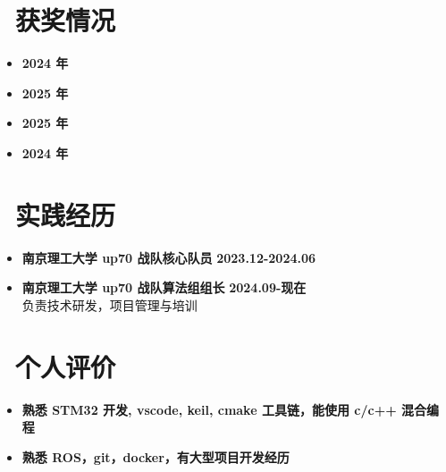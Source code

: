 \documentclass[11pt, a4paper]{article}
\begin{document}
\section{\faTrophy \ 获奖情况}
\begin{itemize}[leftmargin=1.5em, nosep]
    \item {}  \hfill \textbf{2024 年}
    \item {}  \hfill \textbf{2025 年}
    \item {}  \hfill \textbf{2025 年}
    \item {}  \hfill \textbf{2024 年}
\end{itemize}

\section{\faBriefcase \ 实践经历}
\begin{itemize}[leftmargin=1.5em, nosep]
    \item \textbf{南京理工大学 up70 战队核心队员} \hfill \textbf{2023.12-2024.06}
    \vspace{4pt}
    \item \textbf{南京理工大学 up70 战队算法组组长} \hfill \textbf{2024.09-现在} \\
    负责技术研发，项目管理与培训 %
\end{itemize}

\section{\faUserCheck \ 个人评价}
\begin{itemize}[leftmargin=1.5em, nosep]
    \item \textbf{熟悉 STM32 开发, vscode, keil, cmake 工具链，能使用 c/c++ 混合编程}
    \item \textbf{熟悉 ROS，git，docker，有大型项目开发经历}
\end{itemize}
\end{document}
